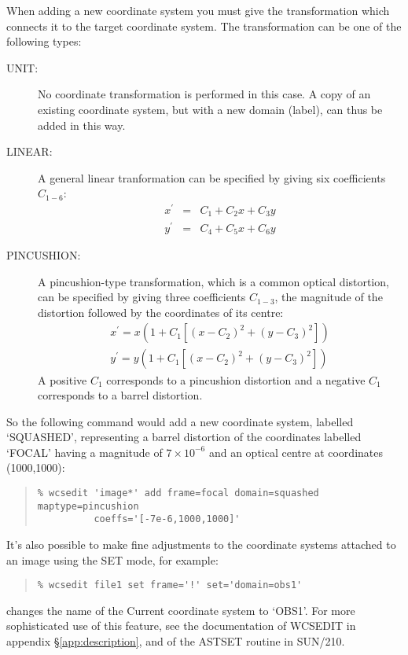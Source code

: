 \documentclass[twoside,11pt]{article}
\newcommand{\htmlref}[2]{#1}
\newcommand{\xref}[3]{#1}
\renewcommand{\_}{\texttt{\symbol{95}}}
\newenvironment{myquote}{\begin{quote}\begin{small}}{\end{small}\end{quote}}
\newcommand{\xroutine}[1]{\htmlref{{\sc #1}}{#1}}
\begin{document}
When adding a new 
coordinate system you must give the transformation which connects it 
to the target coordinate system.
The transformation can be one of the following types:
\begin{description}
\item[UNIT:]
No coordinate transformation is performed in this case.
A copy of an existing coordinate system, but with a new domain (label),
can thus be added in this way.
\item[LINEAR:]
A general linear tranformation can be specified by giving six
coefficients $C_{1-6}$:
\begin{eqnarray*}
   x^\prime & = & C_1 + C_2 x + C_3 y \\
   y^\prime & = & C_4 + C_5 x + C_6 y
\end{eqnarray*}
\item[PINCUSHION:]
A pincushion-type transformation,
which is a common optical distortion,
can be specified by giving three coefficients $C_{1-3}$, 
the magnitude of the distortion followed by the coordinates of its centre:
\begin{eqnarray*}
   x^\prime = x \left( 1 + C_1  \left[ \left( x - C_2 \right)^2 
                                     + \left( y - C_3 \right)^2 \right] \right)
   \\
   y^\prime = y \left( 1 + C_1  \left[ \left( x - C_2 \right)^2 
                                     + \left( y - C_3 \right)^2 \right] \right)
\end{eqnarray*}
A positive $C_1$ corresponds to a pincushion distortion and 
a negative $C_1$ corresponds to a barrel distortion.
\end{description}
So the following command would 
add a new coordinate system, labelled `SQUASHED', 
representing a barrel distortion of the coordinates labelled `FOCAL' 
having a magnitude of $7\times 10^{-6}$ 
and an optical centre at coordinates (1000,1000):
\begin{myquote}
\begin{verbatim}
% wcsedit 'image*' add frame=focal domain=squashed maptype=pincushion 
          coeffs='[-7e-6,1000,1000]'
\end{verbatim}
\end{myquote}

It's also possible to make fine adjustments to the coordinate
systems attached to an image using the SET mode, for example:
\begin{myquote}
\begin{verbatim}
% wcsedit file1 set frame='!' set='domain=obs1'
\end{verbatim}
\end{myquote}
changes the name of the Current coordinate system to `OBS1'.
For more sophisticated use of this feature, see the documentation
of \xroutine{WCSEDIT} in appendix \S\ref{app:description}, and of
the \xref{AST\_SET}{sun210}{AST\_SET} routine in \xref{SUN/210}{sun210}{}.
\end{document}
